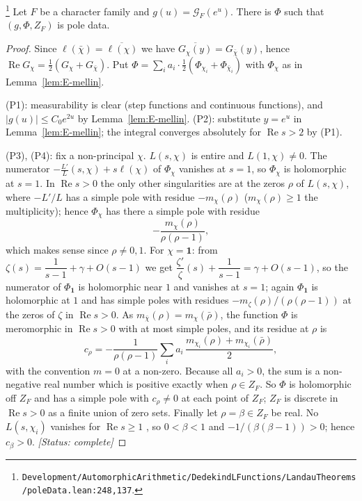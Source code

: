 \begin{proposition}\label{prop:E-poledata-family}
\footnote{\nolinkurl{Development/AutomorphicArithmetic/DedekindLFunctions/LandauTheorems/poleData.lean:248,137}.}%
Let $F$ be a character family and $g(u)=\mathcal G_F(e^{u})$. There is $\Phi$ such that
$(g,\Phi,Z_F)$ is pole data.
\end{proposition}
\begin{proof}
Since $\ell(\bar\chi)=\overline{\ell(\chi)}$ we have $\overline{G_\chi(y)}=G_{\bar\chi}(y)$, hence
$\operatorname{Re}G_\chi=\tfrac12(G_\chi+G_{\bar\chi})$. Put
$\Phi=\sum_ia_i\cdot\tfrac12(\Phi_{\chi_i}+\Phi_{\bar\chi_i})$ with $\Phi_\chi$ as in
Lemma~\ref{lem:E-mellin}.

(P1): measurability is clear (step functions and continuous functions), and
$|g(u)|\le C_0e^{2u}$ by Lemma~\ref{lem:E-mellin}. (P2): substitute $y=e^{u}$ in
Lemma~\ref{lem:E-mellin}; the integral converges absolutely for $\operatorname{Re}s>2$ by (P1).

(P3), (P4): fix a non-principal $\chi$. $L(s,\chi)$ is entire and $L(1,\chi)\neq0$. The numerator
$-\frac{L'}{L}(s,\chi)+s\ell(\chi)$ of $\Phi_\chi$ vanishes at $s=1$, so $\Phi_\chi$ is holomorphic
at $s=1$. In $\operatorname{Re}s>0$ the only other singularities are at the zeros $\rho$ of
$L(s,\chi)$, where $-L'/L$ has a simple pole with residue $-m_\chi(\rho)$ ($m_\chi(\rho)\ge1$ the
multiplicity); hence $\Phi_\chi$ has there a simple pole with residue
\[
-\frac{m_\chi(\rho)}{\rho(\rho-1)} ,
\]
which makes sense since $\rho\neq0,1$. For $\chi=\mathbf 1$: from
$\zeta(s)=\dfrac1{s-1}+\gamma+O(s-1)$ we get
$\dfrac{\zeta'}{\zeta}(s)+\dfrac1{s-1}=\gamma+O(s-1)$, so the numerator of $\Phi_{\mathbf1}$ is
holomorphic near $1$ and vanishes at $s=1$; again $\Phi_{\mathbf 1}$ is holomorphic at $1$ and has
simple poles with residues $-m_\zeta(\rho)/(\rho(\rho-1))$ at the zeros of $\zeta$ in
$\operatorname{Re}s>0$. As $m_{\bar\chi}(\rho)=m_\chi(\bar\rho)$, the function $\Phi$ is meromorphic
in $\operatorname{Re}s>0$ with at most simple poles, and its residue at $\rho$ is
\[
c_\rho=-\frac{1}{\rho(\rho-1)}\sum_ia_i\,\frac{m_{\chi_i}(\rho)+m_{\chi_i}(\bar\rho)}{2},
\]
with the convention $m=0$ at a non-zero. Because all $a_i>0$, the sum is a non-negative real number
which is positive exactly when $\rho\in Z_F$. So $\Phi$ is holomorphic off $Z_F$ and has a simple
pole with $c_\rho\neq0$ at each point of $Z_F$; $Z_F$ is discrete in $\operatorname{Re}s>0$ as a
finite union of zero sets. Finally let $\rho=\beta\in Z_F$ be real. No $L(s,\chi_i)$ vanishes for
$\operatorname{Re}s\ge1$ \cite{E-mathlib-nonvanishing}, so $0<\beta<1$ and
$-1/(\beta(\beta-1))>0$; hence $c_\beta>0$.
\textit{[Status: complete]}
\end{proof}

